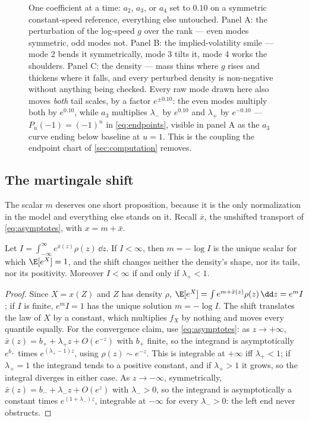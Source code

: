 \begin{figure}[htbp]
\centering
{}
\caption{One coefficient at a time: $a_2$, $a_3$, or $a_4$ set to $0.10$ on
a symmetric constant-speed reference, everything else untouched.  Panel A:
the perturbation of the log-speed $g$ over the rank --- even modes
symmetric, odd modes not.  Panel B: the implied-volatility smile --- mode 2
bends it symmetrically, mode 3 tilts it, mode 4 works the shoulders.
Panel C: the density --- mass thins where $g$ rises and thickens where it
falls, and every perturbed density is non-negative without anything being
checked.  Every raw mode drawn here also moves \emph{both} tail scales, by
a factor $e^{\pm0.10}$: the even modes multiply both by $e^{0.10}$, while
$a_3$ multiplies $\lambda_-$ by $e^{0.10}$ and $\lambda_+$ by $e^{-0.10}$
--- $P_n(-1)=(-1)^{n}$ in \eqref{eq:endpoints}, visible in panel A as the
$a_3$ curve ending below baseline at $u=1$.  This is the coupling the
endpoint chart of \cref{sec:computation} removes.}
\label{fig:modes}
\end{figure}

\subsection{The martingale shift}

The scalar $m$ deserves one short proposition, because it is the only
normalization in the model and everything else stands on it.  Recall
$\bar{x}$, the unshifted transport of \eqref{eq:asymptotes}, with
$x=m+\bar{x}$.

\begin{proposition}
\label{prop:shift}
Let $I=\int_{-\infty}^{\infty}e^{\bar{x}(z)}\rho(z)\,\dd z$.  If
$I<\infty$, then $m=-\log I$ is the unique scalar for which
$\E[e^{X}]=1$, and the shift changes neither the density's shape, nor its
tails, nor its positivity.  Moreover $I<\infty$ if and only if
$\lambda_+<1$.
\end{proposition}

\begin{proof}
Since $X=x(Z)$ and $Z$ has density $\rho$,
$\E[e^{X}]=\int e^{m+\bar{x}(z)}\rho(z)\,\dd z=e^{m}I$; if $I$ is finite,
$e^{m}I=1$ has the unique solution $m=-\log I$.  The shift translates the
law of $X$ by a constant, which multiplies $f_X$ by nothing and moves every
quantile equally.  For the convergence claim, use \eqref{eq:asymptotes}:
as $z\to+\infty$, $\bar{x}(z)=b_++\lambda_+z+O(e^{-z})$ with $b_+$
finite, so the integrand is asymptotically $e^{b_+}$ times
$e^{(\lambda_+-1)z}$, using $\rho(z)\sim e^{-z}$.  This is integrable at
$+\infty$ iff $\lambda_+<1$; if $\lambda_+=1$ the integrand tends to a
positive constant, and if $\lambda_+>1$ it grows, so the integral diverges
in either case.  As $z\to-\infty$, symmetrically,
$\bar{x}(z)=b_-+\lambda_-z+O(e^{z})$ with $\lambda_->0$, so the integrand
is asymptotically a constant times $e^{(1+\lambda_-)z}$, integrable at
$-\infty$ for every $\lambda_->0$: the left end never obstructs.
\end{proof}

